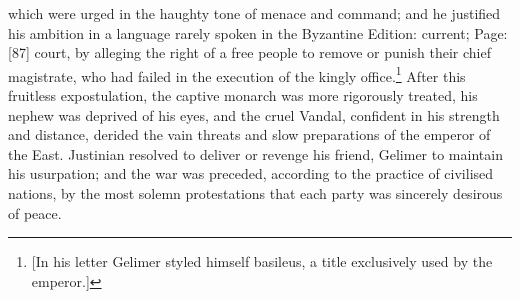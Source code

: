 which were urged in the haughty tone of menace and command; and he justified his ambition in a language rarely spoken in the Byzantine Edition: current; Page: [87] court, by alleging the right of a free people to remove or punish their chief magistrate, who had failed in the execution of the kingly office.\footnote{[In his letter Gelimer styled himself basileus, a title exclusively used by the emperor.]} After this fruitless expostulation, the captive monarch was more rigorously treated, his nephew was deprived of his eyes, and the cruel Vandal, confident in his strength and distance, derided the vain threats and slow preparations of the emperor of the East. Justinian resolved to deliver or revenge his friend, Gelimer to maintain his usurpation; and the war was preceded, according to the practice of civilised nations, by the most solemn protestations that each party was sincerely desirous of peace.

